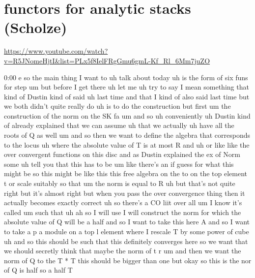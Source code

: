 
\section{ functors for analytic stacks (Scholze)}

\url{https://www.youtube.com/watch?v=R5JNomeHjtI&list=PLx5f8IelFRgGmu6gmL-Kf_Rl_6Mm7juZO}
\renewcommand{\yt}[2]{\href{https://www.youtube.com/watch?v=R5JNomeHjtI&list=PLx5f8IelFRgGmu6gmL-Kf_Rl_6Mm7juZO&t=#1}{#2}}
\vspace{1em}

\begin{unfinished}{0:00}
  e
so  the  main  thing  I  want
to  uh  talk  about  today  uh  is  the  form  of
six  funs  for
step  um  but  before  I  get  there  uh  let
me  uh  try  to  say  I  mean
something  that  kind  of  Dustin  kind  of
said  uh  last  time  and  that  I  kind  of
also  said  last  time  but  we  both  didn't
quite  really  do  uh  is  to  do  the
construction  but
first  um  the
construction  of  the
norm  on  the  SK
fa
um  and  so
uh
conveniently
uh  Dustin  kind  of  already  explained  that
we  can  assume  uh  that  we  actually  uh
have  all  the  roots  of  Q  as
well
um  and  so  then  we  want  to  define  the
algebra  that  corresponds  to  the
locus  uh  where  the  absolute  value  of  T
is  at  most
R  and
uh  or  like  like  the  over  convergent
functions  on  this  disc  and  as  Dustin
explained  the  ex  of  Norm  some  uh  tell
you  that  this  has  to  be
um  like  there's  an  if  guess  for  what
this  might  be  so  this  might  be  like  this
this  free  algebra  on  the  to  on  the  top
element  t  or  scale  suitably  so  that  um
the  norm  is  equal  to  R  uh  but  that's  not
quite  right  but  it's  almost  right  but
when  you  pass  the  over  convergence  thing
then  it  actually  becomes  exactly  correct
uh  so  there's  a  CO  liit  over
all
um  I  know  it's
called  um  such
that  uh  ah  so  I  will  use  I  will
construct  the  norm  for  which  the
absolute  value  of  Q  will  be  a
half  and  so  I  want  to
take  this  here  A  and  so  I  want  to  take  a
p  a  module  on  a  top  l
element  where  I
rescale  T  by  some  power  of
cube  uh  and  so  this  should  be  such  that
this  definitely  converges  here  so  we
want  that  we  should  secretly  think  that
maybe  the  norm  of  t  r  um  and  then  we
want  the  norm  of  Q  to  the  T  *  T  this
should  be  bigger  than  one  but  okay  so
this  is  the  nor  of  Q  is  half  so  a  half  T

\end{unfinished}

